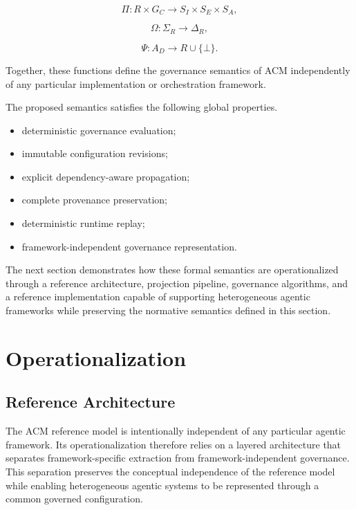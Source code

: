 \documentclass[10pt]{article}
\begin{document}
\[
\Pi:R\times G_C\rightarrow
S_I
\times
S_E
\times
S_A,
\]

\[
\Omega:\Sigma_R\rightarrow\Delta_R,
\]

\[
\Psi:A_D\rightarrow
R
\cup
\{\bot\}.
\]

Together, these functions define the governance semantics of ACM independently of any particular implementation or orchestration framework.

The proposed semantics satisfies the following global properties.

\begin{itemize}

\item deterministic governance evaluation;

\item immutable configuration revisions;

\item explicit dependency-aware propagation;

\item complete provenance preservation;

\item deterministic runtime replay;

\item framework-independent governance representation.

\end{itemize}

The next section demonstrates how these formal semantics are operationalized through a reference architecture, projection pipeline, governance algorithms, and a reference implementation capable of supporting heterogeneous agentic frameworks while preserving the normative semantics defined in this section.

\section{Operationalization}
\label{sec:operationalization}
\subsection{Reference Architecture}

The ACM reference model is intentionally independent of any particular agentic framework. Its operationalization therefore relies on a layered architecture that separates framework-specific extraction from framework-independent governance. This separation preserves the conceptual independence of the reference model while enabling heterogeneous agentic systems to be represented through a common governed configuration.
\end{document}
